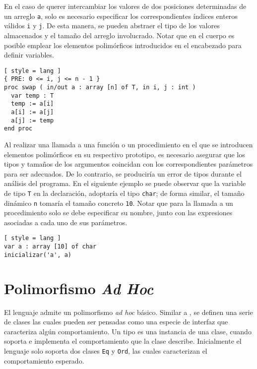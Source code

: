 En el caso de querer intercambiar los valores de dos posiciones determinadas de un arreglo \lstinline[style = lang]{a}, solo es necesario especificar los correspondientes índices enteros válidos \lstinline[style = lang]{i} y \lstinline[style = lang]{j}.
De esta manera, se pueden abstraer el tipo de los valores almacenados y el tamaño del arreglo involucrado. 
Notar que en el cuerpo es posible emplear los elementos polimórficos introducidos en el encabezado para definir variables.

\begin{lstlisting}[ style = lang ]
{ PRE: 0 <= i, j <= n - 1 }
proc swap ( in/out a : array [n] of T, in i, j : int )
  var temp : T
  temp := a[i]
  a[i] := a[j]
  a[j] := temp
end proc
\end{lstlisting}

Al realizar una llamada a una función o un procedimiento en el que se introducen elementos polimórficos en su respectivo prototipo, es necesario asegurar que los tipos y tamaños de los argumentos coincidan con los correspondientes parámetros para ser adecuados.
De lo contrario, se produciría un error de tipos durante el análisis del programa.
En el siguiente ejemplo se puede observar que la variable de tipo \lstinline[style = lang]{T} en la declaración, adoptaría el tipo \lstinline[style = lang]{char}; de forma similar, el tamaño dinámico \lstinline[style = lang]{n} tomaría el tamaño concreto \lstinline[style = lang]{10}.
Notar que para la llamada a un procedimiento solo se debe especificar su nombre, junto con las expresiones asociadas a cada uno de sus parámetros.

\begin{lstlisting}[ style = lang ]
var a : array [10] of char
inicializar('a', a)
\end{lstlisting}



\section{Polimorfismo \textit{Ad Hoc}}

El lenguaje admite un polimorfismo \textit{ad hoc} básico.
Similar a \Haskell, se definen una serie de clases las cuales pueden ser pensadas como una especie de interfaz que caracteriza algún comportamiento.
Un tipo es una instancia de una clase, cuando soporta e implementa el comportamiento que la clase describe.
Inicialmente el lenguaje solo soporta dos clases \lstinline[style = lang]{Eq} y \lstinline[style = lang]{Ord}, las cuales caracterizan el comportamiento esperado.


